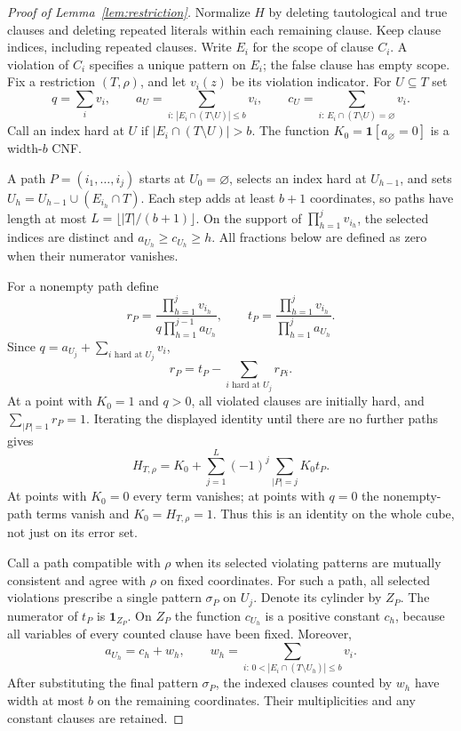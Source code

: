\documentclass[11pt]{article}
\begin{document}
\begin{proof}[Proof of Lemma~\ref{lem:restriction}]
Normalize $H$ by deleting tautological and true clauses and deleting repeated
literals within each remaining clause. Keep clause indices, including
repeated clauses. Write $E_i$ for the scope of clause $C_i$. A violation of
$C_i$ specifies a unique pattern on $E_i$; the false clause has empty scope.
Fix a restriction $(T,\rho)$, and let $v_i(z)$ be its violation indicator.
For $U\subseteq T$ set
\[
 q=\sum_i v_i,\qquad
 a_U=\sum_{i:\,|E_i\cap(T\setminus U)|\le b}v_i,\qquad
 c_U=\sum_{i:\,E_i\cap(T\setminus U)=\varnothing}v_i.
\]
Call an index hard at $U$ if $|E_i\cap(T\setminus U)|>b$.
The function $K_0=\mathbf1[a_\varnothing=0]$ is a width-$b$ CNF.

A path $P=(i_1,\ldots,i_j)$ starts at $U_0=\varnothing$, selects an index
hard at $U_{h-1}$, and sets $U_h=U_{h-1}\cup(E_{i_h}\cap T)$.
Each step adds at least $b+1$ coordinates, so paths have length at most
$L=\lfloor |T|/(b+1)\rfloor$. On the support of
$\prod_{h=1}^j v_{i_h}$, the selected indices are distinct and
$a_{U_h}\ge c_{U_h}\ge h$.
All fractions below are defined as zero when their numerator vanishes.

For a nonempty path define
\[
 r_P=\frac{\prod_{h=1}^jv_{i_h}}
                {q\prod_{h=1}^{j-1}a_{U_h}},\qquad
 t_P=\frac{\prod_{h=1}^jv_{i_h}}
                {\prod_{h=1}^{j}a_{U_h}}.
\]
Since $q=a_{U_j}+\sum_{i\text{ hard at }U_j}v_i$,
\[
 r_P=t_P-\sum_{i\text{ hard at }U_j}r_{Pi}.
\]
At a point with $K_0=1$ and $q>0$, all violated clauses are initially hard,
and $\sum_{|P|=1}r_P=1$. Iterating the displayed identity until there are
no further paths gives
\begin{equation}\label{eq:audited-expansion}
 H_{T,\rho}=K_0+
   \sum_{j=1}^{L}(-1)^j\sum_{|P|=j}K_0t_P.
\end{equation}
At points with $K_0=0$ every term vanishes; at points with $q=0$ the
nonempty-path terms vanish and $K_0=H_{T,\rho}=1$.
Thus this is an identity on the whole cube, not just on its error set.

Call a path compatible with $\rho$ when its selected violating patterns
are mutually consistent and agree with $\rho$ on fixed coordinates.
For such a path, all selected violations prescribe a single pattern
$\sigma_P$ on $U_j$. Denote its cylinder by $Z_P$.
The numerator of $t_P$ is $\mathbf1_{Z_P}$.
On $Z_P$ the function $c_{U_h}$ is a positive constant $c_h$, because all
variables of every counted clause have been fixed. Moreover,
\[
 a_{U_h}=c_h+w_h,
 \qquad
 w_h=\sum_{i:\,0<|E_i\cap(T\setminus U_h)|\le b}v_i.
\]
After substituting the final pattern $\sigma_P$, the indexed clauses
counted by $w_h$ have width at most $b$ on the remaining coordinates.
Their multiplicities and any constant clauses are retained.


\end{proof}
\end{document}
